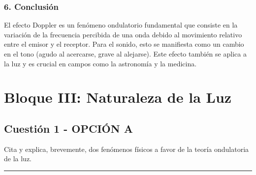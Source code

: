 \subsubsection*{6. Conclusión}
\begin{cajaconclusion}
El efecto Doppler es un fenómeno ondulatorio fundamental que consiste en la variación de la frecuencia percibida de una onda debido al movimiento relativo entre el emisor y el receptor. Para el sonido, esto se manifiesta como un cambio en el tono (agudo al acercarse, grave al alejarse). Este efecto también se aplica a la luz y es crucial en campos como la astronomía y la medicina.
\end{cajaconclusion}

\newpage
\section{Bloque III: Naturaleza de la Luz}
\label{sec:luz_2000_sep_ext}

\subsection{Cuestión 1 - OPCIÓN A}
\label{subsec:3A_2000_sep_ext}

\begin{cajaenunciado}
Cita y explica, brevemente, dos fenómenos físicos a favor de la teoría ondulatoria de la luz.
\end{cajaenunciado}
\hrule

